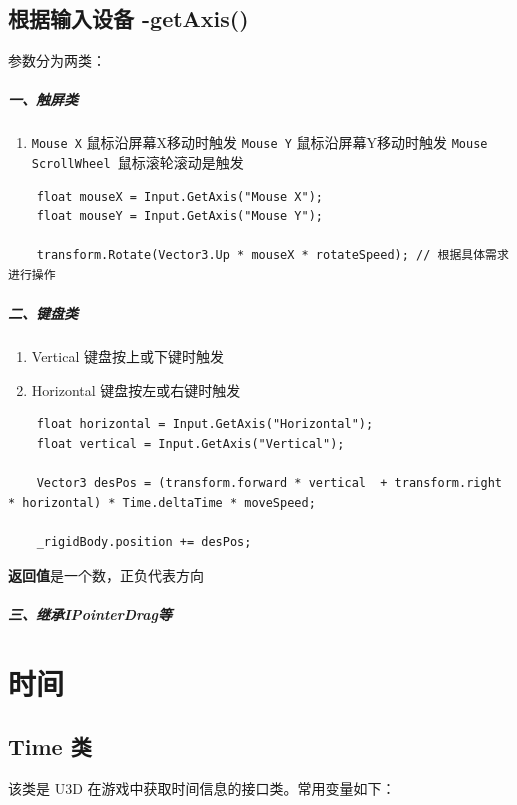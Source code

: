 \documentclass[UTF8,a4paper,12pt]{ctexbook}
\begin{document}
	\section{根据输入设备 -getAxis()}
		参数分为两类： 
		\paragraph{一、触屏类}
		 	\begin{enumerate}
			 	\item \verb|Mouse X| 鼠标沿屏幕X移动时触发 
			 	\verb|Mouse Y| 鼠标沿屏幕Y移动时触发 
			 	\verb|Mouse ScrollWheel |鼠标滚轮滚动是触发 
		 	\end{enumerate}
			
			\begin{lstlisting}
	float mouseX = Input.GetAxis("Mouse X");
	float mouseY = Input.GetAxis("Mouse Y");
	
	transform.Rotate(Vector3.Up * mouseX * rotateSpeed); // 根据具体需求进行操作
			\end{lstlisting}
		
		\paragraph{二、键盘类}
		 	\begin{enumerate}
		 		\item Vertical 键盘按上或下键时触发 
		 		\item Horizontal 键盘按左或右键时触发
		 	\end{enumerate}
		 	
		 	\begin{lstlisting}
	float horizontal = Input.GetAxis("Horizontal");
	float vertical = Input.GetAxis("Vertical");
	
	Vector3 desPos = (transform.forward * vertical  + transform.right * horizontal) * Time.deltaTime * moveSpeed;
	
	_rigidBody.position += desPos;
		 	\end{lstlisting}
		\textbf{返回值}是一个数，正负代表方向
		
		\paragraph{三、继承IPointerDrag等}
			
\chapter{时间}
 	\section{Time 类}
 		该类是 U3D 在游戏中获取时间信息的接口类。常用变量如下：
 		
\end{document}
